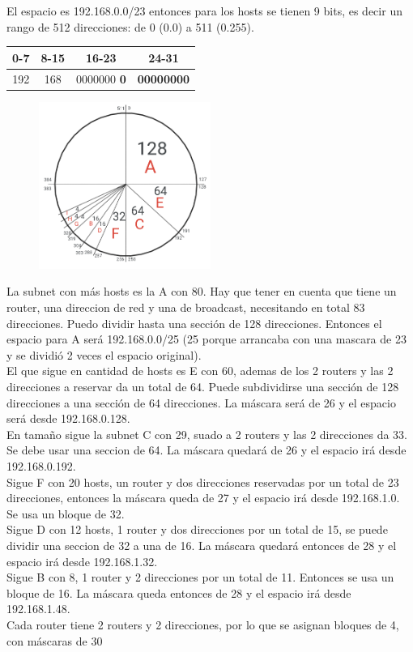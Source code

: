 El espacio es 192.168.0.0/23 entonces para los hosts se tienen 9 bits, es decir un rango de 512 direcciones: de 0 (0.0) a 511 (0.255).

\begin{center}
     \begin{tabular}{c|c|c|c}
          0-7 & 8-15 & 16-23 & 24-31 \\
          \hline
          192 & 168 & 0000000 \textbf{0} & \textbf{00000000}
     \end{tabular}
\end{center}

\begin{figure}[H]
\centering
\includegraphics[width=0.5\textwidth]{imagenes/subnettingTorta.png}
\end{figure}


La subnet con más hosts es la A con 80. Hay que tener en cuenta que tiene un router, una direccion de red y una de broadcast, necesitando en total 83 direcciones. Puedo dividir hasta una sección de 128 direcciones. Entonces el espacio para A será  192.168.0.0/25 (25 porque arrancaba con una mascara de 23 y se dividió 2 veces el espacio original).\\
El que sigue en cantidad de hosts es E con 60, ademas de los 2 routers y las 2 direcciones a reservar da un total de 64. Puede subdividirse una sección de 128 direcciones a una sección de 64 direcciones. La máscara será de 26 y el espacio será desde 192.168.0.128.\\
En tamaño sigue la subnet C con 29, suado a 2 routers y las 2 direcciones da 33. Se debe usar una seccion de 64. La máscara quedará de 26 y el espacio irá desde 192.168.0.192.\\
Sigue F con 20 hosts, un router y dos direcciones reservadas por un total de 23 direcciones, entonces la máscara queda de 27 y el espacio irá desde 192.168.1.0. Se usa un bloque de 32.\\
Sigue D con 12 hosts, 1 router y dos direcciones por un total de 15, se puede dividir una seccion de 32 a una de 16. La máscara quedará entonces de 28 y el espacio irá desde 192.168.1.32.\\
Sigue B con 8, 1 router y 2 direcciones por un total de 11. Entonces se usa un bloque de 16. La máscara queda entonces de 28 y el espacio irá desde 192.168.1.48.\\
Cada router tiene 2 routers y 2 direcciones, por lo que se asignan bloques de 4, con máscaras de 30\\


